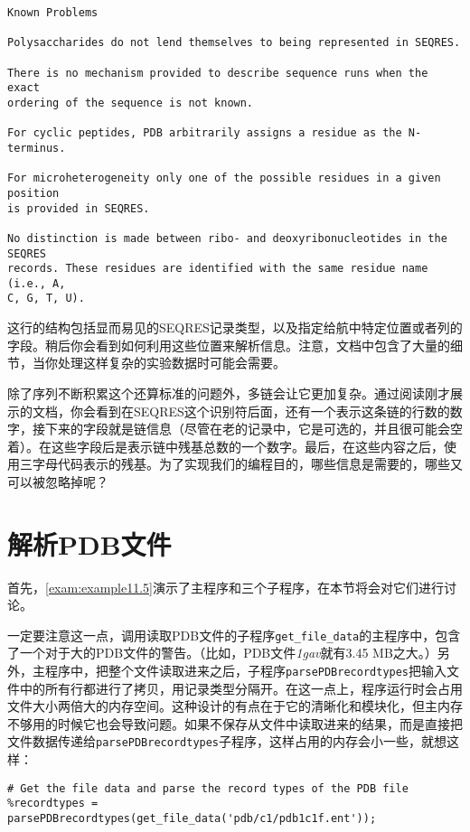 \begin{lstlisting}
Known Problems 

Polysaccharides do not lend themselves to being represented in SEQRES. 

There is no mechanism provided to describe sequence runs when the exact
ordering of the sequence is not known. 

For cyclic peptides, PDB arbitrarily assigns a residue as the N-terminus. 

For microheterogeneity only one of the possible residues in a given position
is provided in SEQRES. 

No distinction is made between ribo- and deoxyribonucleotides in the SEQRES
records. These residues are identified with the same residue name (i.e., A,
C, G, T, U). 
\end{lstlisting}

这行的结构包括显而易见的SEQRES记录类型，以及指定给航中特定位置或者列的字段。稍后你会看到如何利用这些位置来解析信息。注意，文档中包含了大量的细节，当你处理这样复杂的实验数据时可能会需要。

除了序列不断积累这个还算标准的问题外，多链会让它更加复杂。通过阅读刚才展示的文档，你会看到在SEQRES这个识别符后面，还有一个表示这条链的行数的数字，接下来的字段就是链信息（尽管在老的记录中，它是可选的，并且很可能会空着）。在这些字段后是表示链中残基总数的一个数字。最后，在这些内容之后，使用三字母代码表示的残基。为了实现我们的编程目的，哪些信息是需要的，哪些又可以被忽略掉呢？

\section{解析PDB文件}
首先，\autoref{exam:example11.5}演示了主程序和三个子程序，在本节将会对它们进行讨论。



一定要注意这一点，调用读取PDB文件的子程序\verb|get_file_data|的主程序中，包含了一个对于大的PDB文件的警告。（比如，PDB文件\textit{1gav}就有3.45
MB之大。）另外，主程序中，把整个文件读取进来之后，子程序\verb|parsePDBrecordtypes|把输入文件中的所有行都进行了拷贝，用记录类型分隔开。在这一点上，程序运行时会占用文件大小两倍大的内存空间。这种设计的有点在于它的清晰化和模块化，但主内存不够用的时候它也会导致问题。如果不保存从文件中读取进来的结果，而是直接把文件数据传递给\verb|parsePDBrecordtypes|子程序，这样占用的内存会小一些，就想这样：

\begin{lstlisting}
# Get the file data and parse the record types of the PDB file
%recordtypes = parsePDBrecordtypes(get_file_data('pdb/c1/pdb1c1f.ent'));
\end{lstlisting}

